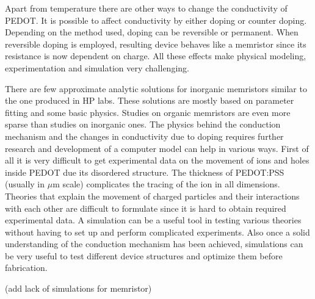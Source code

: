 Apart from temperature there are other ways to change the conductivity of PEDOT. It is possible to affect conductivity by either doping or counter doping. Depending on the method used, doping can be reversible or permanent. When reversible doping is employed, resulting device behaves like a memristor since its resistance is now dependent on charge. All these effects make physical modeling, experimentation and simulation very challenging. 

There are few approximate analytic solutions for inorganic memristors similar to the one produced in HP labs. These solutions are mostly based on parameter fitting and some basic physics. Studies on organic memristors are even more sparse than studies on inorganic ones. The physics behind the conduction mechanism and the changes in conductivity due to doping requires further research and development of a computer model can help in various ways. First of all it is very difficult to get experimental data on the movement of ions and holes inside PEDOT due its disordered structure. The thickness of PEDOT:PSS (usually in $\mu$m scale) complicates the tracing of the ion in all dimensions. Theories that explain the movement of charged particles and their interactions with each other are difficult to formulate since it is hard to obtain required experimental data. A simulation can be a useful tool in testing various theories without having to set up and perform complicated experiments. Also once a solid understanding of the conduction mechanism has been achieved, simulations can be very useful to test different device structures and optimize them before fabrication. 

(add lack of simulations for memristor)
 